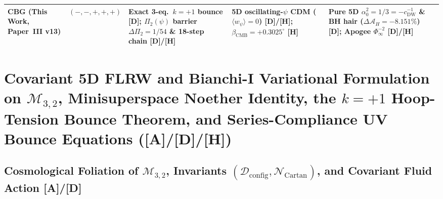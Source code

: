 \documentclass[11pt,a4paper]{article}
\newcommand{\catA}{\textbf{\textcolor{purple!80!black}{[A]}}}
\newcommand{\catD}{\textbf{\textcolor{blue!75!black}{[D]}}}
\newcommand{\catH}{\textbf{\textcolor{orange!85!black}{[H]}}}
\theoremstyle{plain}
\theoremstyle{definition}
\theoremstyle{remark}
\numberwithin{equation}{section}
\begin{document}
\begin{table}[H]
\begin{tabularx}{\textwidth}{@{} L{0.16\textwidth} c Y Y Y @{}}
\addlinespace[2.5pt]
\textbf{CBG (This Work, Paper~III v13)} \cite{jimenez2026_p0,jimenez2026a,jimenez2026b} & $(-,-,+,+,+)$ & \textbf{Exact 3-eq.\ $k=+1$ bounce \catD; $\Pi_2(\psi)$ barrier $\Delta\Pi_2=1/54$ \& 18-step chain \catD/\catH} & \textbf{5D oscillating-$\psi$ CDM ($\langle w_{\psi}\rangle = 0$) \catD/\catH; $\beta_{\text{CMB}} = +0.3025^\circ$ \catH} & \textbf{Pure 5D $\alpha_0^2=1/3=-c_{\text{DW}}^{-1}$ \& BH hair ($\Delta\mathcal{A}_H = -8.151\%$) \catD; Apogee $\Phi_{\infty}^{-2}$ \catD/\catH} \\
\bottomrule
\end{tabularx}
\end{table}

\section{\texorpdfstring{Covariant 5D FLRW and Bianchi-I Variational Formulation on $\mathcal{M}_{3,2}$, Minisuperspace Noether Identity, the $k = +1$ Hoop-Tension Bounce Theorem, and Series-Compliance UV Bounce Equations (\catA/\catD/\catH)}{Covariant 5D FLRW and Bianchi-I Variational Formulation on M_3,2, Minisuperspace Noether Identity, the k = +1 Hoop-Tension Bounce Theorem, and Series-Compliance UV Bounce Equations}}

\subsection{\texorpdfstring{Cosmological Foliation of $\mathcal{M}_{3,2}$, Invariants $(\mathcal{D}_{\text{config}}, \mathcal{N}_{\text{Cartan}})$, and Covariant Fluid Action \catA/\catD}{Cosmological Foliation of M_3,2, Invariants (D_config, N_Cartan), and Covariant Fluid Action}}
\end{document}
